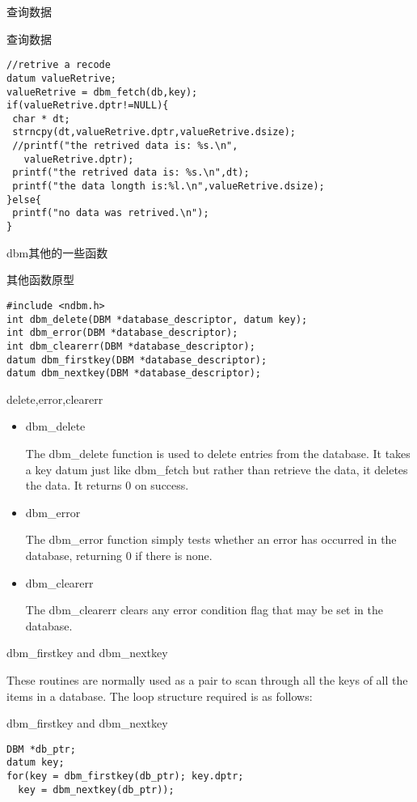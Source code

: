 \documentclass{beamer}
\begin{document}
\begin{frame}[fragile]{查询数据}
\begin{block}{查询数据}
\begin{lstlisting}
//retrive a recode
datum valueRetrive;
valueRetrive = dbm_fetch(db,key);
if(valueRetrive.dptr!=NULL){
 char * dt;
 strncpy(dt,valueRetrive.dptr,valueRetrive.dsize);
 //printf("the retrived data is: %s.\n",
   valueRetrive.dptr);
 printf("the retrived data is: %s.\n",dt);
 printf("the data longth is:%l.\n",valueRetrive.dsize);
}else{
 printf("no data was retrived.\n");
}
\end{lstlisting}
\end{block}
\end{frame}

\begin{frame}[fragile]{dbm其他的一些函数}
\begin{block}{其他函数原型}
\begin{lstlisting}
#include <ndbm.h>
int dbm_delete(DBM *database_descriptor, datum key); 
int dbm_error(DBM *database_descriptor);
int dbm_clearerr(DBM *database_descriptor);
datum dbm_firstkey(DBM *database_descriptor);
datum dbm_nextkey(DBM *database_descriptor);
\end{lstlisting}
\end{block}
\end{frame}
\begin{frame}{delete,error,clearerr}
\begin{itemize}
\item
dbm\_delete

The dbm\_delete function is used to delete entries from the database. It takes a key datum just like dbm\_fetch but rather than retrieve the data, it deletes the data. It returns 0 on success.
\item
dbm\_error

The dbm\_error function simply tests whether an error has occurred in the database, returning 0 if there is none.
\item
dbm\_clearerr

The dbm\_clearerr clears any error condition flag that may be set in the database.
\end{itemize}
\end{frame}
\begin{frame}[fragile]{dbm\_firstkey and dbm\_nextkey}

These routines are normally used as a pair to scan through all the keys of all the items in a database. The loop structure required is as follows:

\begin{block}{dbm\_firstkey and dbm\_nextkey}
\begin{lstlisting}
DBM *db_ptr; 
datum key;
for(key = dbm_firstkey(db_ptr); key.dptr; 
  key = dbm_nextkey(db_ptr));
\end{lstlisting}
\end{block}
\end{frame}
\end{document}
